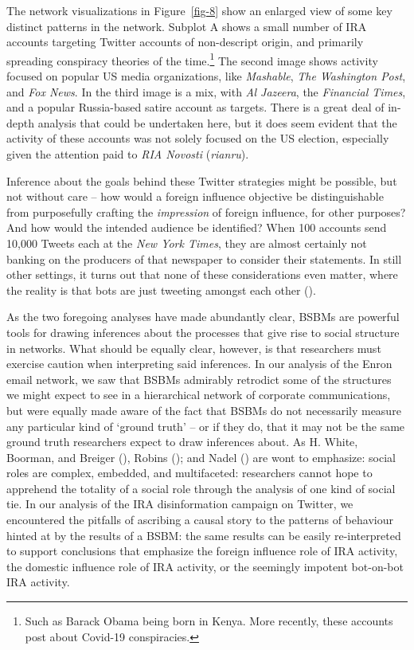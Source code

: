 \documentclass[
  12pt,
  a4paper,
  DIV=11,
  numbers=noendperiod,
  twoside,
  open=any]{scrartcl}
\begin{document}
The network visualizations in Figure~\ref{fig-8} show an enlarged view
of some key distinct patterns in the network. Subplot A shows a small
number of IRA accounts targeting Twitter accounts of non-descript
origin, and primarily spreading conspiracy theories of the
time.\footnote{Such as Barack Obama being born in Kenya. More recently,
  these accounts post about Covid-19 conspiracies.} The second image
shows activity focused on popular US media organizations, like
\emph{Mashable}, \emph{The Washington Post}, and \emph{Fox News}. In the
third image is a mix, with \emph{Al Jazeera}, the \emph{Financial
Times}, and a popular Russia-based satire account as targets. There is a
great deal of in-depth analysis that could be undertaken here, but it
does seem evident that the activity of these accounts was not solely
focused on the US election, especially given the attention paid to
\emph{RIA Novosti} (\emph{rianru}).

Inference about the goals behind these Twitter strategies might be
possible, but not without care -- how would a foreign influence
objective be distinguishable from purposefully crafting the
\emph{impression} of foreign influence, for other purposes? And how
would the intended audience be identified? When 100 accounts send 10,000
Tweets each at the \emph{New York Times}, they are almost certainly not
banking on the producers of that newspaper to consider their statements.
In still other settings, it turns out that none of these considerations
even matter, where the reality is that bots are just tweeting amongst
each other ().

As the two foregoing analyses have made abundantly clear, BSBMs are
powerful tools for drawing inferences about the processes that give rise
to social structure in networks. What should be equally clear, however,
is that researchers must exercise caution when interpreting said
inferences. In our analysis of the Enron email network, we saw that
BSBMs admirably retrodict some of the structures we might expect to see
in a hierarchical network of corporate communications, but were equally
made aware of the fact that BSBMs do not necessarily measure any
particular kind of `ground truth' -- or if they do, that it may not be
the same ground truth researchers expect to draw inferences about. As H.
White, Boorman, and Breiger (),
Robins (); and Nadel
() are wont to emphasize:
social roles are complex, embedded, and multifaceted: researchers cannot
hope to apprehend the totality of a social role through the analysis of
one kind of social tie. In our analysis of the IRA disinformation
campaign on Twitter, we encountered the pitfalls of ascribing a causal
story to the patterns of behaviour hinted at by the results of a BSBM:
the same results can be easily re-interpreted to support conclusions
that emphasize the foreign influence role of IRA activity, the domestic
influence role of IRA activity, or the seemingly impotent bot-on-bot IRA
activity.
\end{document}
